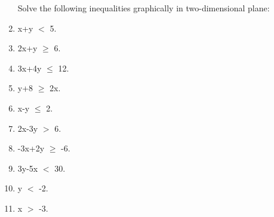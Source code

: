 \begin{enumerate}[label=\arabic*.,ref=\thesubsection.\theenumi]
Solve the following inequalities graphically in two-dimensional plane:
    \item x+y $<$ 5.\\
    \item 2x+y $\geq$ 6.\\    
    \item 3x+4y $\leq$ 12.\\
    \item y+8 $\geq$ 2x.\\
    \item x-y $\leq$ 2.\\
    \item 2x-3y $>$ 6.\\
    \item -3x+2y $\geq$ -6.\\
    \item 3y-5x $<$ 30.\\
    \item y $<$ -2.\\
    \item x $>$ -3.\\
   

\end{enumerate}

